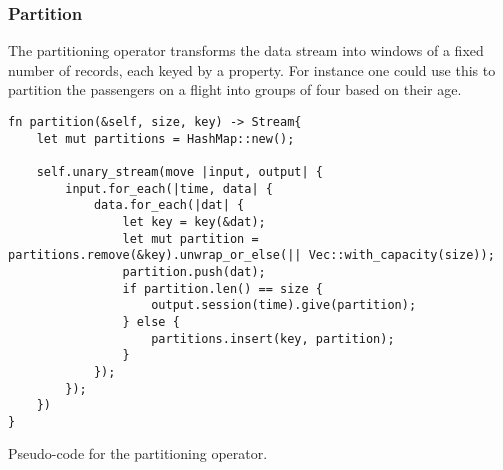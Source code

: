\subsubsection{Partition}
The partitioning operator transforms the data stream into windows of a fixed number of records, each keyed by a property. For instance one could use this to partition the passengers on a flight into groups of four based on their age.

\begin{listing}[H]
\begin{verbatim}
fn partition(&self, size, key) -> Stream{
    let mut partitions = HashMap::new();

    self.unary_stream(move |input, output| {
        input.for_each(|time, data| {
            data.for_each(|dat| {
                let key = key(&dat);
                let mut partition = partitions.remove(&key).unwrap_or_else(|| Vec::with_capacity(size));
                partition.push(dat);
                if partition.len() == size {
                    output.session(time).give(partition);
                } else {
                    partitions.insert(key, partition);
                }
            });
        });
    })
}
\end{verbatim}
  \caption{Pseudo-code for the partitioning operator.}
  \label{lst:reduce-to}
\end{listing}


